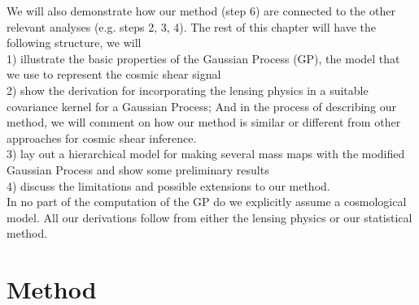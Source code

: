 We will also demonstrate how our method
(step 6) are connected to the other relevant analyses (e.g. steps 2, 3, 4). 
The rest of this chapter will have the following structure, we will \\ 
1) illustrate the basic properties of the Gaussian Process (GP), the model that we
use to represent the cosmic shear signal\\ 
2) show the derivation for incorporating the lensing physics in 
a suitable covariance kernel for a Gaussian Process;  
And in the process of describing our method, we will comment on how our method is  
similar or different from other approaches for cosmic shear inference. \\
3) lay out a hierarchical model for making several mass maps 
with the modified Gaussian Process and show some preliminary results \\ 
4) discuss the limitations and possible extensions to our method.\\
In no part of the computation of the GP do we explicitly assume a cosmological model. All our
derivations follow from either the lensing physics or our statistical method.   


\section{Method}


